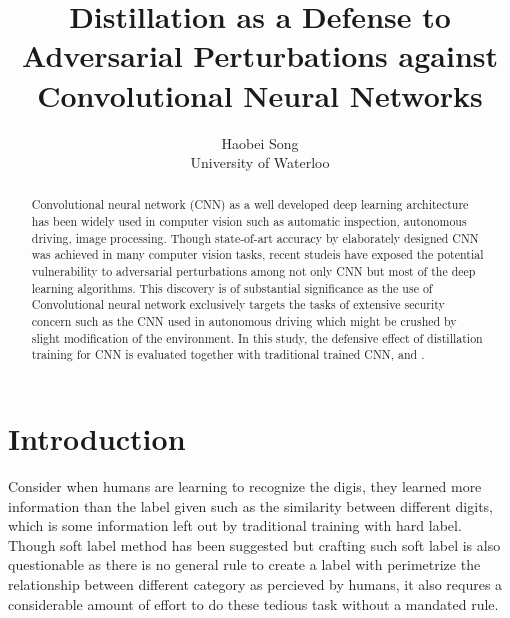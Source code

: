 \documentclass{article}
\title{Distillation as a Defense to Adversarial Perturbations against Convolutional Neural Networks}
\author{Haobei Song \\
        University of Waterloo}
\begin{document}
\maketitle
{}
\newpage
{}

\begin{abstract}
	Convolutional neural network (CNN) as a well developed deep learning architecture has been widely used in computer vision such as automatic inspection, autonomous driving, image processing. 
	Though state-of-art accuracy by elaborately designed CNN was achieved in many computer vision tasks, 
	recent studeis have exposed the potential vulnerability to adversarial perturbations among not only CNN but most of the deep learning algorithms.
	This discovery is of substantial significance as the use of Convolutional neural network exclusively targets the tasks of extensive security concern
	such as the CNN used in autonomous driving which might be crushed by slight modification of the environment. 
	In this study, the defensive effect of distillation training for CNN is evaluated together with traditional trained CNN, and .
\end{abstract}
\section{Introduction}
Consider when humans are learning to recognize the digis, they learned more information than the label given such as the similarity between different digits, which is some information left out by traditional training with hard label. Though soft label method has been suggested but crafting such soft label is also questionable as there is no general rule to create a label with perimetrize the relationship between different category as percieved by humans, it also requres a considerable amount of effort to do these tedious task without a mandated rule.
\end{document}
